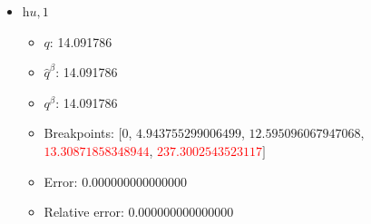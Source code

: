 \documentclass{article}%
\begin{document}
\begin{itemize}
\begin{itemize}
		\item $q^\beta$: 38.884836%
		\item Breakpoints: $[$$0$, $21.04660840930274$, $24.97364426355679$, \textcolor{red}{$34.23465128608717$}, \textcolor{red}{$285.4001551947793$}$]$%
		\item Error: 0.000000000000000%
		\item Relative error: 0.000000000000000%
	\end{itemize}%
	\item $\textit{hu},1$%
	\begin{itemize}%
		\item $q$: 14.091786%
		\item $\hat{q}^\beta$: 14.091786%
		\item $q^\beta$: 14.091786%
		\item Breakpoints: $[$$0$, $4.943755299006499$, $12.595096067947068$, \textcolor{red}{$13.30871858348944$}, \textcolor{red}{$237.3002543523117$}$]$%
		\item Error: 0.000000000000000%
		\item Relative error: 0.000000000000000%
	\end{itemize}%
\end{itemize}%
\end{document}
